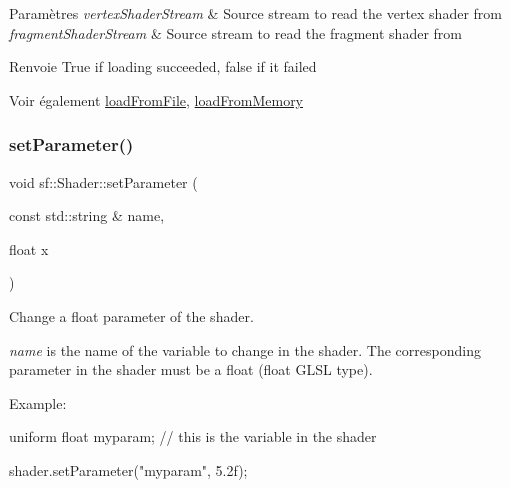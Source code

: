 \begin{DoxyParams}{Paramètres}
{\em vertex\+Shader\+Stream} & Source stream to read the vertex shader from \\
\hline
{\em fragment\+Shader\+Stream} & Source stream to read the fragment shader from\\
\hline
\end{DoxyParams}
\begin{DoxyReturn}{Renvoie}
True if loading succeeded, false if it failed
\end{DoxyReturn}
\begin{DoxySeeAlso}{Voir également}
\hyperlink{classsf_1_1Shader_a053a5632848ebaca2fcd8ba29abe9e6e}{load\+From\+File}, \hyperlink{classsf_1_1Shader_ac92d46bf71dff2d791117e4e472148aa}{load\+From\+Memory} 
\end{DoxySeeAlso}
\mbox{\label{classsf_1_1Shader_a47e4dd78f0752ae08664b4ee616db1cf}} 
\subsubsection{\texorpdfstring{set\+Parameter()}{setParameter()}\hspace{0.1cm}{\footnotesize\ttfamily [1/10]}}
{\footnotesize\ttfamily void sf\+::\+Shader\+::set\+Parameter (\begin{DoxyParamCaption}\item[{const std\+::string \&}]{name,  }\item[{float}]{x }\end{DoxyParamCaption})}



Change a float parameter of the shader. 

{\itshape name} is the name of the variable to change in the shader. The corresponding parameter in the shader must be a float (float G\+L\+SL type).

Example\+: 
\begin{DoxyCode}
uniform \textcolor{keywordtype}{float} myparam; \textcolor{comment}{// this is the variable in the shader}
\end{DoxyCode}
 
\begin{DoxyCode}
shader.setParameter(\textcolor{stringliteral}{"myparam"}, 5.2f);
\end{DoxyCode}



